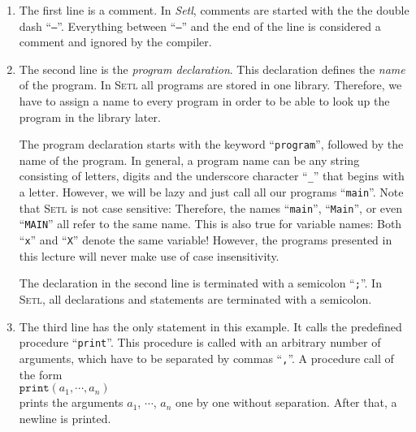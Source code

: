 \begin{enumerate}
\item The first line is a comment.  In \textsl{Setl}, comments are started with the
      the  double dash  ``\texttt{--}''.  Everything between ``\texttt{--}'' and the end of
      the line is considered a comment and ignored by the compiler.
\item The second line is the  \emph{program declaration}.  This declaration defines the
      \emph{name} of the program.  In \textsc{Setl} all programs are stored in one
      library.  Therefore, we have to assign  a name to every program in order to be able
      to look up the program in the library later.

      The  program declaration starts with the keyword ``\texttt{program}'', followed
      by the name of the  program.  In general, a program name can be any string consisting of
      letters, digits and the underscore character ``\texttt{\_}'' that begins with a
      letter.  However, we will be lazy and just call all our programs ``\texttt{main}''.
      Note that \textsc{Setl} is not case sensitive:  Therefore, the names ``\texttt{main}'',
      ``\texttt{Main}'', or even ``\texttt{MAIN}'' all refer to the same name.   This is
      also true for variable names:  Both ``\texttt{x}'' and ``\texttt{X}'' denote the
      same variable!  However, the programs presented in this lecture will never make use
      of case insensitivity.

      The declaration in the second line is terminated with a semicolon ``\texttt{;}''.  
      In \textsc{Setl}, all declarations and statements are terminated with a semicolon.
\item The third line has the only statement in this example.  It calls the predefined 
      procedure  ``\texttt{print}''.   This procedure is called with an arbitrary number
      of arguments, which have to be separated by commas ``\texttt{,}''.  A procedure call
      of the form
      \\[0.2cm]
      \hspace*{1.3cm}
      $\mathtt{print}(a_1, \cdots, a_n)$
      \\[0.2cm]
      prints the arguments $a_1$, $\cdots$, $a_n$ one by one without separation.  After
      that, a newline is printed.
      

\end{enumerate}
